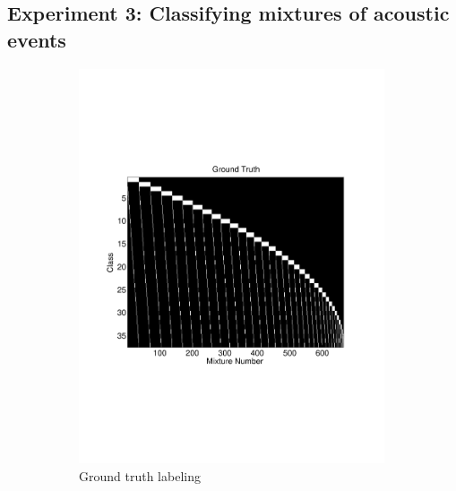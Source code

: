 \documentclass[a4paper,10pt,final]{ThesisStyle}
\begin{document}
\subsection{Experiment 3: Classifying mixtures of acoustic events}


\begin{figure}
\centering
\begin{subfigure}[b]{0.5\textwidth}
\centering
\includegraphics[width=0.99\textwidth]{images/mixture-groundtruth.pdf}
\caption{Ground truth labeling}
\end{subfigure}%
\begin{subfigure}[b]{0.5\textwidth}
\centering

\end{subfigure}
\end{figure}
\end{document}
